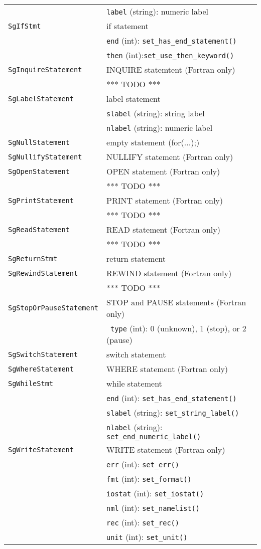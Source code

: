 \begin{longtable}[l]{l|p{10cm}}
 & \texttt{label} (string): numeric label\\
 \texttt{SgIfStmt}& if statement\\
 & \texttt{end} (int): \texttt{set\_has\_end\_statement()}\\
 & \texttt{then} (int):\texttt{set\_use\_then\_keyword()}\\
 \texttt{SgInquireStatement}& INQUIRE statemtent (Fortran only)\\
 & *** TODO *** \\
 \texttt{SgLabelStatement}& label statement\\
 & \texttt{slabel} (string): string label\\
 & \texttt{nlabel} (string): numeric label\\
 \texttt{SgNullStatement}& empty statement (for(...){;})\\
 \texttt{SgNullifyStatement}& NULLIFY statement (Fortran only)\\
 \texttt{SgOpenStatement}& OPEN statement (Fortran only)\\
 & *** TODO *** \\
 \texttt{SgPrintStatement}& PRINT statement (Fortran only)\\
 & *** TODO *** \\
 \texttt{SgReadStatement}& READ statement (Fortran only)\\
 & *** TODO *** \\
 \texttt{SgReturnStmt}& return statement\\
 \texttt{SgRewindStatement}& REWIND statement (Fortran only)\\
 & *** TODO *** \\
 \texttt{SgStopOrPauseStatement}& STOP and PAUSE statements (Fortran only)\\
 & ~\texttt{type} (int): 0 (unknown), 1 (stop), or 2 (pause)\\
 \texttt{SgSwitchStatement}& switch statement\\
 \texttt{SgWhereStatement}& WHERE statement (Fortran only)\\
 \texttt{SgWhileStmt}& while statement\\
 & \texttt{end} (int): \texttt{set\_has\_end\_statement()}\\
 & \texttt{slabel} (string): \texttt{set\_string\_label()}\\
 & \texttt{nlabel} (string): \texttt{set\_end\_numeric\_label()}\\
 \texttt{SgWriteStatement}& WRITE statement (Fortran only)\\
 & \texttt{err} (int): \texttt{set\_err()}\\
 & \texttt{fmt} (int): \texttt{set\_format()}\\
 & \texttt{iostat} (int): \texttt{set\_iostat()}\\
 & \texttt{nml} (int): \texttt{set\_namelist()}\\
 & \texttt{rec} (int): \texttt{set\_rec()}\\
 & \texttt{unit} (int): \texttt{set\_unit()}\\
 \end{longtable}

